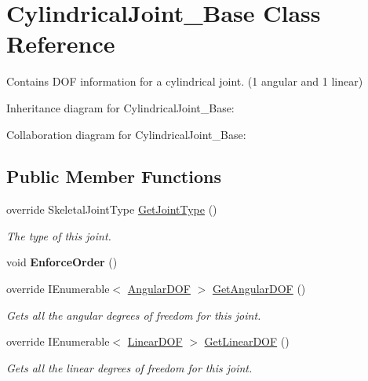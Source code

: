 \hypertarget{class_cylindrical_joint___base}{}\section{Cylindrical\+Joint\+\_\+\+Base Class Reference}
\label{class_cylindrical_joint___base}


Contains D\+OF information for a cylindrical joint. (1 angular and 1 linear)  




Inheritance diagram for Cylindrical\+Joint\+\_\+\+Base\+:


Collaboration diagram for Cylindrical\+Joint\+\_\+\+Base\+:
\subsection*{Public Member Functions}
\begin{DoxyCompactItemize}
\item 
override Skeletal\+Joint\+Type \hyperlink{class_cylindrical_joint___base_a1ee432bc31e0ee98266169233210e621}{Get\+Joint\+Type} ()
\begin{DoxyCompactList}\small\item\em The type of this joint. \end{DoxyCompactList}\item 
\mbox{\label{class_cylindrical_joint___base_a2d7031bde80932c01af131b341708e1a}} 
void {\bfseries Enforce\+Order} ()
\item 
override I\+Enumerable$<$ \hyperlink{interface_angular_d_o_f}{Angular\+D\+OF} $>$ \hyperlink{class_cylindrical_joint___base_a9eba59edd9ac877a3be28e652b364b59}{Get\+Angular\+D\+OF} ()
\begin{DoxyCompactList}\small\item\em Gets all the angular degrees of freedom for this joint. \end{DoxyCompactList}\item 
override I\+Enumerable$<$ \hyperlink{interface_linear_d_o_f}{Linear\+D\+OF} $>$ \hyperlink{class_cylindrical_joint___base_a5e10f664ba08afb2788e2251831c8246}{Get\+Linear\+D\+OF} ()
\begin{DoxyCompactList}\small\item\em Gets all the linear degrees of freedom for this joint. \end{DoxyCompactList}\end{DoxyCompactItemize}
